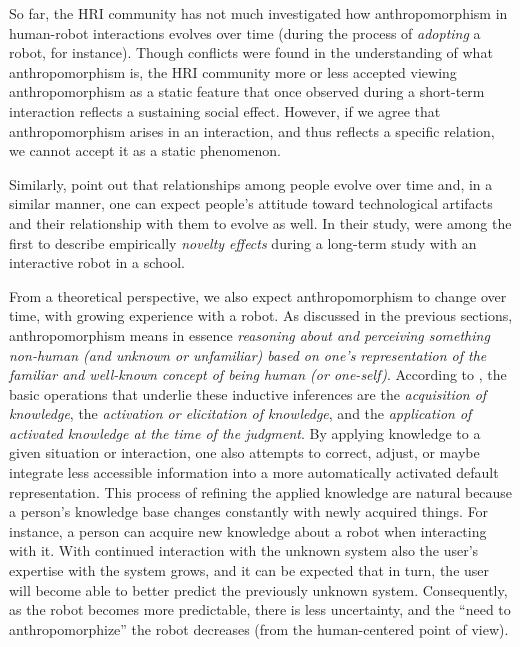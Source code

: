 \documentclass{frontiersSCNS} %
\begin{document}
So far, the HRI community has not much investigated how anthropomorphism in
human-robot interactions evolves over time (during the process of
\emph{adopting} a robot, for instance). Though conflicts were found in the
understanding of what anthropomorphism is, the HRI community more or less
accepted viewing anthropomorphism as a static feature that once observed during
a short-term interaction reflects a sustaining social effect. However, if we
agree that anthropomorphism arises in an interaction, and thus reflects a
specific relation, we cannot accept it as a static phenomenon.

Similarly, \citet{kanda_interactive_2004} point out that relationships among
people evolve over time and, in a similar manner, one can expect people's
attitude toward technological artifacts and their relationship with them to
evolve as well.  In their study, \citet{kanda_interactive_2004} were among the
first to describe empirically \emph{novelty effects} during a long-term study
with an interactive robot in a school.

From a theoretical perspective, we also expect anthropomorphism to change over
time, with growing experience with a robot. As discussed in the previous
sections, anthropomorphism means in essence \emph{reasoning about and perceiving
    something non-human (and unknown or unfamiliar) based on one's
representation of the familiar and well-known concept of being human (or
one-self)}. According to \citet{epley_when_2008}, the basic operations that
underlie these inductive inferences are the \emph{acquisition of knowledge}, the
\emph{activation or elicitation of knowledge}, and the \emph{application of
activated knowledge at the time of the judgment}. By applying knowledge to a
given situation or interaction, one also attempts to correct, adjust, or maybe
integrate less accessible information into a more automatically activated
default representation.  This process of refining the applied knowledge are
natural because a person's knowledge base changes constantly with newly acquired
things. For instance, a person can acquire new knowledge about a robot when
interacting with it. With continued interaction with the unknown system also the
user's expertise with the system grows, and it can be expected that in turn, the
user will become able to better predict the previously unknown system.
Consequently, as the robot becomes more predictable, there is less uncertainty,
and the ``need to anthropomorphize'' the robot decreases (from the
human-centered point of view).
\end{document}
